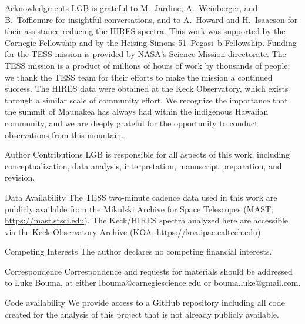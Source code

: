 \documentclass{nature3}
\begin{document}
\begin{addendum}

\item[Acknowledgments]
  LGB is grateful to M.~Jardine, A.~Weinberger, and B.~Tofflemire for
  insightful conversations, and to A.~Howard and H.~Isaacson for their
  assistance reducing the HIRES spectra.
  This work was supported by the Carnegie Fellowship and by the
  Heising-Simons 51~Pegasi~b Fellowship.
  Funding for the TESS mission is provided by NASA’s Science Mission
  directorate.
  The TESS mission is a product of millions of hours of work by
  thousands of people; we thank the TESS team for their efforts to
  make the mission a continued success.
  The HIRES data were obtained at the Keck Observatory, which exists
  through a similar scale of community effort.
  We recognize the importance that the summit of Maunakea has always had
  within the indigenous Hawaiian community, and we are deeply grateful 
  for the opportunity to conduct observations from this mountain.

\item[Author Contributions] LGB is responsible for all aspects of this
  work, including conceptualization, data analysis, interpretation,
  manuscript preparation, and revision.

\item[Data Availability] The TESS two-minute cadence data used in this
  work are publicly available from the Mikulski Archive for Space
  Telescopes (MAST; \url{https://mast.stsci.edu}). The Keck/HIRES
  spectra analyzed here are accessible via the Keck Observatory
  Archive (KOA; \url{https://koa.ipac.caltech.edu}).

\item[Competing Interests] The author declares no competing financial
  interests.
 
\item[Correspondence] Correspondence and requests for materials should
  be addressed to Luke Bouma, at either lbouma@carnegiescience.edu or
  bouma.luke@gmail.com.
 
\item[Code availability] We provide access to a GitHub repository
  including all code created for the analysis of this project that is
  not already publicly available.

\end{addendum}
\end{document}
